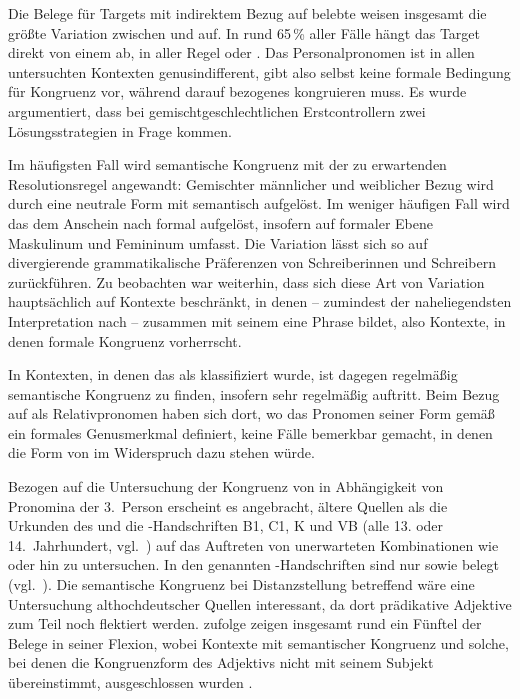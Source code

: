 Die Belege für Targets mit indirektem Bezug auf belebte
 weisen insgesamt die größte Variation zwischen
 und  auf. In rund 65\,\% aller Fälle hängt das Target
direkt von einem  ab, in aller Regel  oder
. Das Personalpronomen ist in allen untersuchten Kontexten
genus\-indifferent, gibt also selbst keine formale
Bedingung für Kongruenz vor, während darauf bezogenes  kongruieren
muss. Es wurde argumentiert, dass bei gemischtgeschlechtlichen Erstcontrollern
zwei Lösungsstrategien in Frage kommen.

Im häufigsten Fall wird semantische Kongruenz mit der
zu erwartenden Resolutionsregel angewandt: Gemischter männlicher und weiblicher
Bezug wird durch eine neutrale Form mit \mbox{} semantisch aufgelöst.
Im weniger häufigen Fall wird das  dem Anschein nach formal
aufgelöst, insofern  auf formaler Ebene Maskulinum und Femininum
umfasst. Die Variation lässt sich so auf divergierende grammatikalische
Präferenzen von Schreiberinnen und Schreibern zurück\-führen. Zu beobachten war
weiterhin, dass sich diese Art von Variation hauptsächlich auf Kontexte
beschränkt, in denen  -- zumindest der naheliegendsten
Interpretation nach -- zusammen mit seinem  eine Phrase
bildet, also Kontexte, in denen formale
Kongruenz vorherrscht.

In Kontexten, in denen das  als 
klassifiziert wurde, ist dagegen regelmäßig semantische
Kongruenz zu finden, insofern sehr regelmäßig
 auftritt. Beim Bezug auf  als
Relativpronomen haben sich dort, wo das Pronomen seiner
Form gemäß ein formales Genusmerkmal definiert, keine Fälle
bemerkbar gemacht, in denen die Form von  im Widerspruch dazu
stehen würde.

Bezogen auf die Untersuchung der Kongruenz von  in Abhängigkeit von
Pro\-nomina der 3.~Person erscheint es angebracht, ältere Quellen
als die Urkunden des \CAO{} und die \KC{}-Handschriften B1, C1, K und VB (alle
13. oder 14.~Jahrhundert, vgl.~) auf das Auftreten von
unerwarteten Kombinationen wie  oder  hin zu
untersuchen. In den genannten \KC{}-Handschriften sind nur 
sowie  belegt (vgl.~). Die
semantische Kongruenz bei Distanz\-stellung
betreffend wäre eine Untersuchung althochdeutscher Quellen
interessant, da dort prädikative Adjektive zum Teil
noch flektiert werden.
\citet[310--311]{fleischer2007} zufolge zeigen insgesamt rund ein Fünftel der
Belege in seiner  Flexion, wobei Kontexte mit semantischer
Kongruenz und solche, bei denen die Kongruenzform des Adjektivs nicht mit
seinem Subjekt übereinstimmt, ausgeschlossen wurden
\autocite[304]{fleischer2007}.

